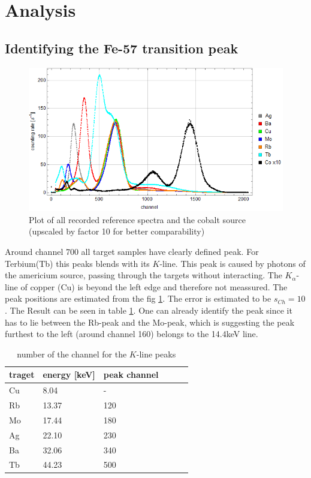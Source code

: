 \section{Analysis}
\subsection{Identifying the Fe-57 transition peak}
\begin{figure}[H]
\centering
\includegraphics[width=1\linewidth]{../results/calibration/spectra}
\caption[Reference spectra]{Plot of all recorded reference spectra and the cobalt source (upscaled by factor 10 for better comparability)}
\label{fig:analysis:spectra}
\end{figure}
Around channel 700 all target samples have clearly defined peak. For Terbium(Tb) this peaks blends with its $K$-line. This peak is caused by photons of the americium source, passing through the targets without interacting. The $K_\alpha$-line of copper (Cu) is beyond the left edge and therefore not meassured. The peak positions are estimated from the fig \ref{fig:analysis:spectra}. The error is estimated to be $s_{Ch}=10$. The Result can be seen in table \ref{tb:analysis:peakpos}. One can already identify the peak since it has to lie between the Rb-peak and the Mo-peak, which is suggesting the peak furthest to the left (around channel 160) belongs to the 14.4keV line.

\begin{table}[H]\centering
	\begin{tabular}{@{}llllll@{}}
		\toprule
		 traget & energy [keV]& peak channel  \\
		\midrule
		Cu & 8.04 & - \\
		Rb & 13.37 & 120 \\
		Mo & 17.44 & 180 \\
		Ag & 22.10 & 230 \\
		Ba & 32.06 & 340 \\
		Tb & 44.23 & 500\\
		\bottomrule
	\end{tabular}
	\caption[peak positions]{number of the channel for the $K$-line peaks}
	\label{tb:analysis:peakpos}
\end{table}

